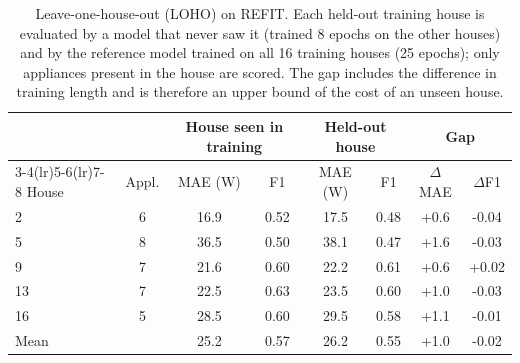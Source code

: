 \begin{table}[H]
\centering
\caption{Leave-one-house-out (LOHO) on REFIT. Each held-out training house is evaluated by a model that never saw it (trained 8 epochs on the other houses) and by the reference model trained on all 16 training houses (25 epochs); only appliances present in the house are scored. The gap includes the difference in training length and is therefore an upper bound of the cost of an unseen house.}
\label{tab:loho}
\footnotesize
\begin{tabular}{@{}lccccccc@{}}
\toprule
 & & \multicolumn{2}{c}{House seen in training} & \multicolumn{2}{c}{Held-out house} & \multicolumn{2}{c}{Gap} \\
\cmidrule(lr){3-4}\cmidrule(lr){5-6}\cmidrule(lr){7-8}
House & Appl. & MAE (W) & F1 & MAE (W) & F1 & $\Delta$MAE & $\Delta$F1 \\
\midrule
2 & 6 & 16.9 & 0.52 & 17.5 & 0.48 & +0.6 & -0.04 \\
5 & 8 & 36.5 & 0.50 & 38.1 & 0.47 & +1.6 & -0.03 \\
9 & 7 & 21.6 & 0.60 & 22.2 & 0.61 & +0.6 & +0.02 \\
13 & 7 & 22.5 & 0.63 & 23.5 & 0.60 & +1.0 & -0.03 \\
16 & 5 & 28.5 & 0.60 & 29.5 & 0.58 & +1.1 & -0.01 \\
\midrule
Mean & & 25.2 & 0.57 & 26.2 & 0.55 & +1.0 & -0.02 \\
\bottomrule
\end{tabular}
\end{table}

